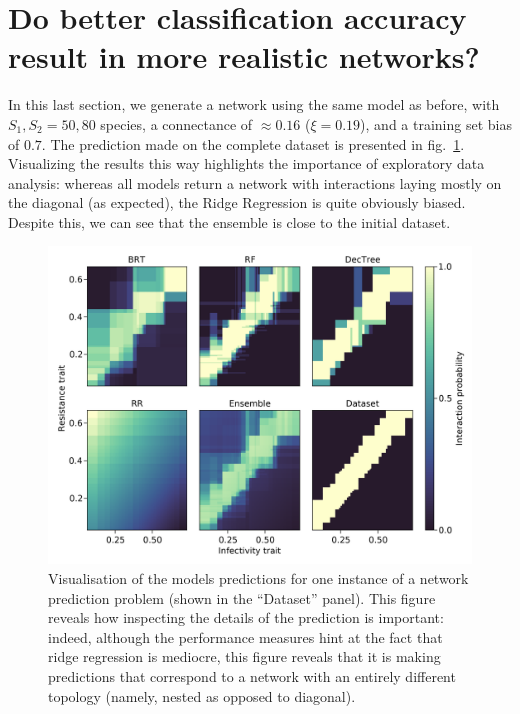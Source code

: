 \documentclass[10pt,oneside]{article}
\makeatletter
\def\maxwidth{\ifdim\Gin@nat@width>\linewidth\linewidth
\else\Gin@nat@width\fi}
\let\Oldincludegraphics\includegraphics
\renewcommand{\includegraphics}[1]{\Oldincludegraphics[width=\maxwidth]{#1}}
\makeatother
\begin{document}
\hypertarget{do-better-classification-accuracy-result-in-more-realistic-networks}{%
\section{Do better classification accuracy result in more realistic
networks?}\label{do-better-classification-accuracy-result-in-more-realistic-networks}}

In this last section, we generate a network using the same model as
before, with \(S_1, S_2 = 50, 80\) species, a connectance of
\(\approx 0.16\) (\(\xi = 0.19\)), and a training set bias of \(0.7\).
The prediction made on the complete dataset is presented in
fig.~\ref{fig:ecovalid}. Visualizing the results this way highlights the
importance of exploratory data analysis: whereas all models return a
network with interactions laying mostly on the diagonal (as expected),
the Ridge Regression is quite obviously biased. Despite this, we can see
that the ensemble is close to the initial dataset.

\begin{figure}
\hypertarget{fig:ecovalid}{%
\centering
\includegraphics{figures/valid_ensemble.png}
\caption{Visualisation of the models predictions for one instance of a
network prediction problem (shown in the ``Dataset'' panel). This figure
reveals how inspecting the details of the prediction is important:
indeed, although the performance measures hint at the fact that ridge
regression is mediocre, this figure reveals that it is making
predictions that correspond to a network with an entirely different
topology (namely, nested as opposed to diagonal).}\label{fig:ecovalid}
}
\end{figure}
\end{document}
